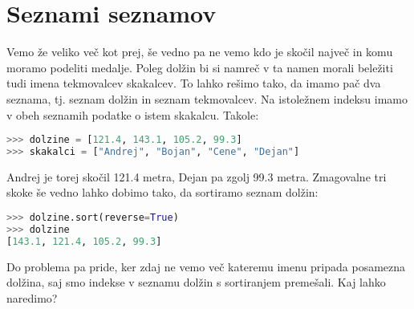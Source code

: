 \section{Seznami seznamov}

Vemo že veliko več kot prej, še vedno pa ne vemo kdo je skočil največ in komu moramo podeliti medalje. Poleg dolžin bi si namreč v ta namen morali beležiti tudi imena tekmovalcev skakalcev. To lahko rešimo tako, da imamo pač dva seznama, tj. seznam dolžin in seznam tekmovalcev. Na istoležnem indeksu imamo v obeh seznamih podatke o istem skakalcu. Takole:
\begin{lstlisting}[language=Python, showstringspaces=false]
>>> dolzine = [121.4, 143.1, 105.2, 99.3]
>>> skakalci = ["Andrej", "Bojan", "Cene", "Dejan"]
\end{lstlisting}
Andrej je torej skočil 121.4 metra, Dejan pa zgolj 99.3 metra. Zmagovalne tri skoke še vedno lahko dobimo tako, da sortiramo seznam dolžin:
\begin{lstlisting}[language=Python, showstringspaces=false]
>>> dolzine.sort(reverse=True)
>>> dolzine
[143.1, 121.4, 105.2, 99.3]
\end{lstlisting}
Do problema pa pride, ker zdaj ne vemo več kateremu imenu pripada posamezna dolžina, saj smo indekse v seznamu dolžin s sortiranjem premešali. Kaj lahko naredimo? 

